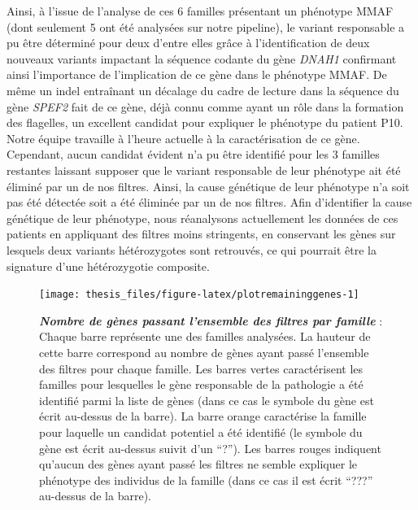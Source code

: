 \documentclass[12pt,a4paper,twoside]{ugathesis}
\theoremstyle{definition}
\theoremstyle{definition}
\theoremstyle{definition}
\theoremstyle{remark}
\begin{document}
Ainsi, à l'issue de l'analyse de ces 6 familles présentant un phénotype
MMAF (dont seulement 5 ont été analysées sur notre pipeline), le variant
responsable a pu être déterminé pour deux d'entre elles grâce à
l'identification de deux nouveaux variants impactant la séquence codante
du gène \emph{DNAH1} confirmant ainsi l'importance de l'implication de
ce gène dans le phénotype MMAF. De même un indel entraînant un décalage
du cadre de lecture dans la séquence du gène \emph{SPEF2} fait de ce
gène, déjà connu comme ayant un rôle dans la formation des flagelles, un
excellent candidat pour expliquer le phénotype du patient P10. Notre
équipe travaille à l'heure actuelle à la caractérisation de ce gène.
Cependant, aucun candidat évident n'a pu être identifié pour les 3
familles restantes laissant supposer que le variant responsable de leur
phénotype ait été éliminé par un de nos filtres. Ainsi, la cause
génétique de leur phénotype n'a soit pas été détectée soit a été
éliminée par un de nos filtres. Afin d'identifier la cause génétique de
leur phénotype, nous réanalysons actuellement les données de ces
patients en appliquant des filtres moins stringents, en conservant les
gènes sur lesquels deux variants hétérozygotes sont retrouvés, ce qui
pourrait être la signature d'une hétérozygotie composite.

\newpage

\begin{figure}

{\centering \texttt{[image: thesis\_files/figure-latex/plotremaininggenes-1]} 

}

\caption[Nombre de gènes passant l'ensemble des filtres par famille]{\textbf{\emph{Nombre de gènes passant
l'ensemble des filtres par famille}} : Chaque barre représente une des
familles analysées. La hauteur de cette barre correspond au nombre de
gènes ayant passé l'ensemble des filtres pour chaque famille. Les barres
vertes caractérisent les familles pour lesquelles le gène responsable de
la pathologie a été identifié parmi la liste de gènes (dans ce cas le
symbole du gène est écrit au-dessus de la barre). La barre orange
caractérise la famille pour laquelle un candidat potentiel a été
identifié (le symbole du gène est écrit au-dessus suivit d'un ``?'').
Les barres rouges indiquent qu'aucun des gènes ayant passé les filtres
ne semble expliquer le phénotype des individus de la famille (dans ce
cas il est écrit ``???'' au-dessus de la barre).}\label{fig:plotremaininggenes}
\end{figure}
\end{document}
